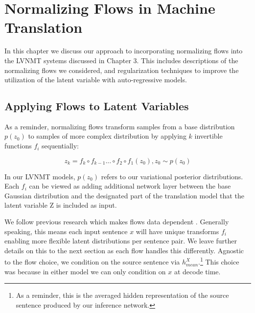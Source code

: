 \chapter{Normalizing Flows in Machine Translation}


In this chapter we discuss our approach to incorporating normalizing flows into the \ac{LVNMT} systems discussed in Chapter 3. This includes descriptions of the normalizing flows we considered, and regularization techniques to improve the utilization of the latent variable with auto-regressive models.
\section{Applying Flows to Latent Variables}


As a reminder, normalizing flows transform samples from a base distribution $p(z_{0})$ to samples of more complex distribution by applying $k$ invertible functions $f_{i}$ sequentially: 

\begin{equation}
z_{k} = f_{k} \circ f_{k-1} ... \circ f_{2} \circ f_{1}(z_{0}) , z_{0} \sim p(z_{0})
\end{equation}

In our \ac{LVNMT} models, $p(z_{0})$ refers to our variational posterior distributions. Each $f_{i}$ can be viewed as adding additional network layer between the base Gaussian distribution and the designated part of the translation model that the latent variable Z is included as input.

We follow previous research which makes flows data dependent \cite{rezende2015VIwithNF,Berg2018SylvesterNF,kingma2016IAF,tomczak2016Householder}.  Generally speaking, this means each input sentence $x$ will have unique transforms $f_{i}$ enabling more flexible latent distributions per sentence pair. We leave further details on this to the next section as each flow handles this differently. Agnostic to the flow choice, we condition on the source sentence via $h_{mean}^{X}$.\footnote{As a reminder, this is the averaged hidden representation of the source sentence produced by our inference network.} This choice was because in either model we can only condition on $x$ at decode time.

